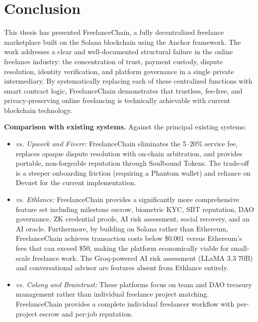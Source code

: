 \section{Conclusion}
\label{section:6.1}

This thesis has presented FreelanceChain, a fully decentralized freelance marketplace built on the Solana blockchain using the Anchor framework. The work addresses a clear and well-documented structural failure in the online freelance industry: the concentration of trust, payment custody, dispute resolution, identity verification, and platform governance in a single private intermediary. By systematically replacing each of these centralized functions with smart contract logic, FreelanceChain demonstrates that trustless, fee-free, and privacy-preserving online freelancing is technically achievable with current blockchain technology.

\textbf{Comparison with existing systems.} Against the principal existing systems:
\begin{itemize}
    \item \textit{vs. Upwork and Fiverr:} FreelanceChain eliminates the 5--20\% service fee, replaces opaque dispute resolution with on-chain arbitration, and provides portable, non-forgeable reputation through Soulbound Tokens. The trade-off is a steeper onboarding friction (requiring a Phantom wallet) and reliance on Devnet for the current implementation.
    \item \textit{vs. Ethlance:} FreelanceChain provides a significantly more comprehensive feature set including milestone escrow, biometric KYC, SBT reputation, DAO governance, ZK credential proofs, AI risk assessment, social recovery, and an AI oracle. Furthermore, by building on Solana rather than Ethereum, FreelanceChain achieves transaction costs below \$0.001 versus Ethereum's fees that can exceed \$50, making the platform economically viable for small-scale freelance work. The Groq-powered AI risk assessment (LLaMA 3.3 70B) and conversational advisor are features absent from Ethlance entirely.
    \item \textit{vs. Colony and Braintrust:} These platforms focus on team and DAO treasury management rather than individual freelance project matching. FreelanceChain provides a complete individual freelancer workflow with per-project escrow and per-job reputation.
\end{itemize}


